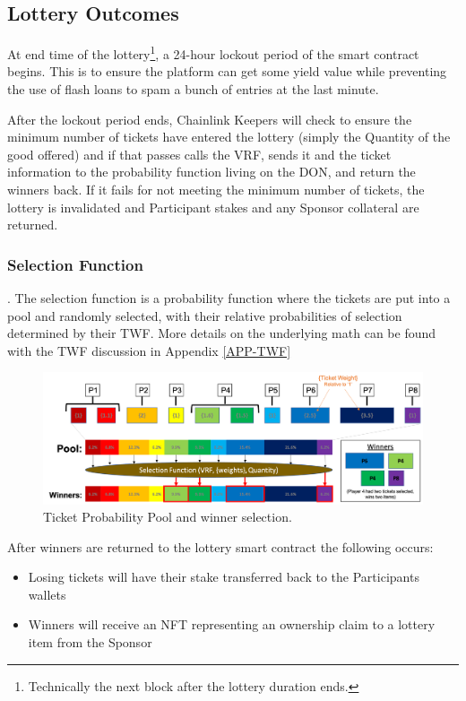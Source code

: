 \documentclass[runningheads]{llncs}
\begin{document}
\subsection{Lottery Outcomes}\label{subsection-LotteryOutcomes}
At end time of the lottery\footnote{Technically the next block after the lottery duration ends.},  a 24-hour lockout period of the smart contract begins.  This is to ensure the platform can get some yield value while preventing the use of flash loans to spam a bunch of entries at the last minute. 

After the lockout period ends, Chainlink Keepers will check to ensure the minimum number of tickets have entered the lottery (simply the Quantity of the good offered) and if that passes calls the VRF, sends it and the ticket information to the probability function living on the DON, and return the winners back.   If it fails for not meeting the minimum number of tickets, the lottery is invalidated and Participant stakes and any Sponsor collateral are returned.   

\subsubsection{Selection Function}.  The selection function is a probability function where the tickets are put into a pool and randomly selected, with their relative probabilities of selection determined by their TWF.  More details on the underlying math can be found with the TWF discussion in Appendix \ref{APP-TWF}

\begin{figure}[H]
\centering
\includegraphics[scale=0.4]{Figures_and_Tables/Ticket_Pool.png}
\caption{Ticket Probability Pool and winner selection.}
\end{figure}

\noindent After winners are returned to the lottery smart contract the following occurs:
\begin{itemize}
\item Losing tickets will have their stake transferred back to the Participants wallets
\item Winners will receive an NFT representing an ownership claim to a lottery item from the Sponsor
\end{itemize}
\end{document}
